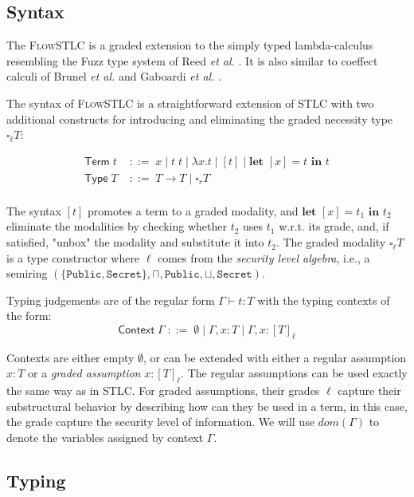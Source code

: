 \documentclass[conference]{IEEEtran}
\newcommand\unp[3]{\textbf{let }[#1]=#2\textbf{ in }#3}
\newcommand\gradedt[2]{\square_#1 #2}
\newcommand\public{\texttt{Public}}
\newcommand\secret{\texttt{Secret}}
\begin{document}
\subsection{Syntax}

The \textsc{FlowSTLC} is a graded extension to the simply typed lambda-calculus resembling the Fuzz type system of Reed \emph{et al.} \cite{reeddistance}. It is also similar to coeffect calculi of Brunel \emph{et al.} \cite{brunel2014core} and Gaboardi \emph{et al.} \cite{gaboardi2016combining}.

The syntax of \textsc{FlowSTLC} is a straightforward extension of STLC with two additional constructs for introducing and eliminating the graded necessity type $\gradedt{\ell}{T}$:

$$
\begin{aligned}
	\textsf{Term}\;t\;&::=\;x\;|\;t\; t\;|\;\lambda x.t\;|\;[t]\;|\;\textbf{let }[x]=t\textbf{ in }t\\
	\textsf{Type}\;T\;&::=\;T\to T\;|\;\square_r T\\
\end{aligned}
$$

The syntax $[t]$ promotes a term to a graded modality, and $\unp{x}{t_1}{t_2}$ eliminate the modalities by checking whether $t_2$ uses $t_1$ w.r.t. its grade, and, if satisfied, "unbox" the modality and substitute it into $t_2$. The graded modality $\gradedt{\ell}{T}$ is a type constructor where $\ell$ comes from the \emph{security level algebra}, i.e., a semiring $(\{\public,\secret\},\sqcap,\public,\sqcup,\secret)$.

Typing judgements are of the regular form $\Gamma\vdash t:T$ with the typing contexts of the form:
$$
\textsf{Context}\;\Gamma\;::=\;\emptyset\;|\;\Gamma,x:T\;|\;\Gamma,x:[T]_\ell
$$

Contexts are either empty $\emptyset$, or can be extended with either a regular assumption $x:T$ or a \emph{graded assumption} $x:[T]_\ell$. The regular assumptions can be used exactly the same way as in STLC. For graded assumptions, their grades $\ell$ capture their substructural behavior by describing how can they be used in a term, in this case, the grade capture the security level of information. We will use $dom(\Gamma)$ to denote the variables assigned by context $\Gamma$.

\subsection{Typing}
\end{document}
